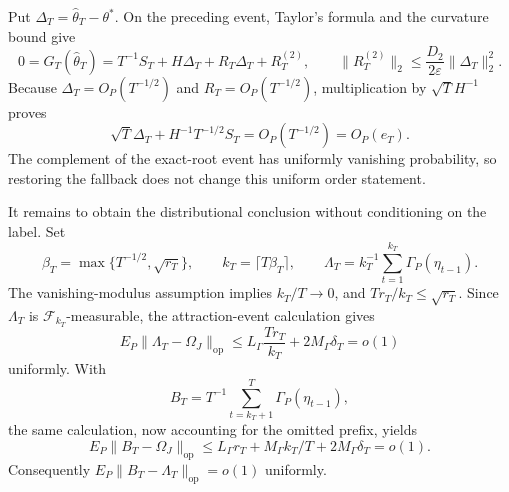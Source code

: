 Put \(\Delta_T=\widehat\theta_T-\theta^*\). On the preceding event, Taylor's formula and the curvature bound give
\[
 0=G_T(\widehat\theta_T)
 =T^{-1}S_T+H\Delta_T+R_T\Delta_T+R_T^{(2)},
 \qquad
 \|R_T^{(2)}\|_2\le\frac{D_2}{2\varepsilon}\|\Delta_T\|_2^2.
\]
Because \(\Delta_T=O_P(T^{-1/2})\) and \(R_T=O_P(T^{-1/2})\), multiplication by \(\sqrt T H^{-1}\) proves
\[
 \sqrt T\Delta_T+H^{-1}T^{-1/2}S_T=O_P(T^{-1/2})=O_P(e_T).
\]
The complement of the exact-root event has uniformly vanishing probability, so restoring the fallback does not change this uniform order statement.

It remains to obtain the distributional conclusion without conditioning on the label. Set
\[
 \beta_T=\max\{T^{-1/2},\sqrt{r_T}\},\qquad
 k_T=\lceil T\beta_T\rceil,\qquad
 \Lambda_T=k_T^{-1}\sum_{t=1}^{k_T}\Gamma_P(\eta_{t-1}).
\]
The vanishing-modulus assumption implies \(k_T/T\to0\), and \(Tr_T/k_T\le\sqrt{r_T}\). Since \(\Lambda_T\) is \(\mathcal F_{k_T}\)-measurable, the attraction-event calculation gives
\[
 E_P\|\Lambda_T-\Omega_J\|_{\mathrm{op}}
 \le L_\Gamma\frac{Tr_T}{k_T}+2M_\Gamma\delta_T=o(1)
\]
uniformly. With
\[
 B_T=T^{-1}\sum_{t=k_T+1}^T\Gamma_P(\eta_{t-1}),
\]
the same calculation, now accounting for the omitted prefix, yields
\[
 E_P\|B_T-\Omega_J\|_{\mathrm{op}}
 \le L_\Gamma r_T+M_\Gamma k_T/T+2M_\Gamma\delta_T=o(1).
\]
Consequently \(E_P\|B_T-\Lambda_T\|_{\mathrm{op}}=o(1)\) uniformly.

